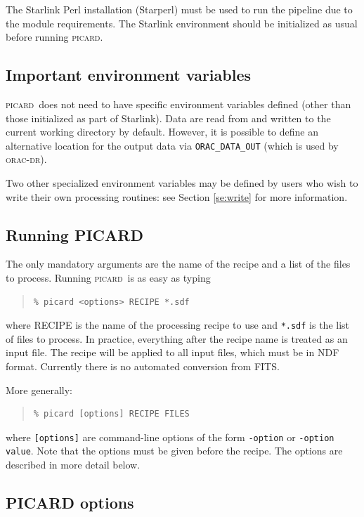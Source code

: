 \documentclass[twoside,11pt]{article}
\renewcommand{\_}{\texttt{\symbol{95}}}
\newenvironment{myquote}{\begin{quote}\begin{small}}{\end{small}\end{quote}}
\newcommand{\oracdr}{\textsc{orac-dr}}
\newcommand{\picard}{\textsc{picard}}
\newcommand{\task}[1]{\textsf{#1}}
\begin{document}
The Starlink Perl installation (Starperl) must be used to run the
pipeline due to the module requirements. The Starlink environment
should be initialized as usual before running \picard.

\subsection{Important environment variables}

\picard\ does not need to have specific environment variables defined
(other than those initialized as part of Starlink). Data are read from
and written to the current working directory by default. However, it
is possible to define an alternative location for the output data via
\verb+ORAC_DATA_OUT+ (which is used by \oracdr).

Two other specialized environment variables may be defined by users
who wish to write their own processing routines: see Section
\ref{se:write} for more information.

\subsection{Running PICARD}

The only mandatory arguments are the name of the recipe and a list of
the files to process. Running \picard\ is as easy as typing
\begin{myquote}
\begin{verbatim}
% picard <options> RECIPE *.sdf
\end{verbatim}
\end{myquote}
where \task{RECIPE} is the name of the processing recipe to use and
\verb+*.sdf+ is the list of files to process. In practice, everything
after the recipe name is treated as an input file. The recipe will be
applied to all input files, which must be in NDF format. Currently
there is no automated conversion from FITS.

More generally:
\begin{myquote}
\begin{verbatim}
% picard [options] RECIPE FILES
\end{verbatim}
\end{myquote}
where \verb+[options]+ are command-line options of the form
\verb+-option+ or \verb+-option value+.  Note that the options must be
given before the recipe. The options are described in more detail
below.

\subsection{PICARD options}
\end{document}
